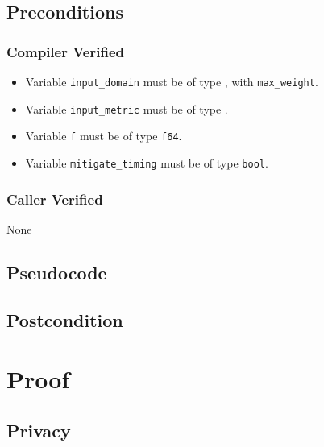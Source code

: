 \documentclass{article}
\begin{document}
\subsection{Preconditions} 
\subsubsection*{Compiler Verified} 
\begin{itemize} 
	\item Variable \texttt{input\_domain} must be of type , with \texttt{max\_weight}. 
	\item Variable \texttt{input\_metric} must be of type . 
	\item Variable \texttt{f} must be of type \texttt{f64}. 
    \item Variable \texttt{mitigate\_timing} must be of type \texttt{bool}. 
\end{itemize} 
 
\subsubsection*{Caller Verified} 
None 
 
\subsection{Pseudocode} 
 
 
 
\subsection{Postcondition} 
 
 
\section{Proof} 
 
\subsection{Privacy} 
 
\end{document}
